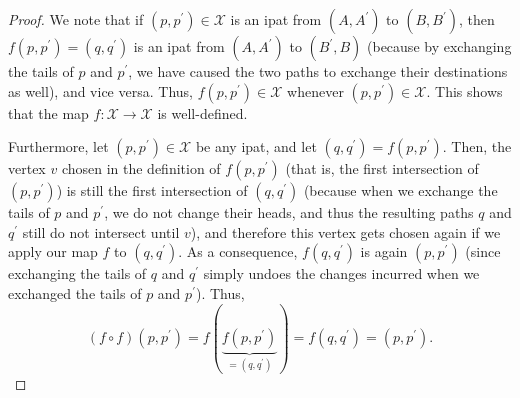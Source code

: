 \begin{definition}
\begin{proof}
We note that if $\left(  p,p^{\prime}\right)  \in\mathcal{X}$ is an ipat from
$\left(  A,A^{\prime}\right)  $ to $\left(  B,B^{\prime}\right)  $, then
$f\left(  p,p^{\prime}\right)  =\left(  q,q^{\prime}\right)  $ is an ipat from
$\left(  A,A^{\prime}\right)  $ to $\left(  B^{\prime},B\right)  $ (because by
exchanging the tails of $p$ and $p^{\prime}$, we have caused the two paths to
exchange their destinations as well), and vice versa. Thus, $f\left(
p,p^{\prime}\right)  \in\mathcal{X}$ whenever $\left(  p,p^{\prime}\right)
\in\mathcal{X}$. This shows that the map $f:\mathcal{X}\rightarrow\mathcal{X}$
is well-defined.

Furthermore, let $\left(  p,p^{\prime}\right)  \in\mathcal{X}$ be any ipat,
and let $\left(  q,q^{\prime}\right)  =f\left(  p,p^{\prime}\right)  $. Then,
the vertex $v$ chosen in the definition of $f\left(  p,p^{\prime}\right)  $
(that is, the first intersection of $\left(  p,p^{\prime}\right)  $) is still
the first intersection of $\left(  q,q^{\prime}\right)  $ (because when we
exchange the tails of $p$ and $p^{\prime}$, we do not change their heads, and
thus the resulting paths $q$ and $q^{\prime}$ still do not intersect until
$v$), and therefore this vertex gets chosen again if we apply our map $f$ to
$\left(  q,q^{\prime}\right)  $. As a consequence, $f\left(  q,q^{\prime
}\right)  $ is again $\left(  p,p^{\prime}\right)  $ (since exchanging the
tails of $q$ and $q^{\prime}$ simply undoes the changes incurred when we
exchanged the tails of $p$ and $p^{\prime}$). Thus,
\[
\left(  f\circ f\right)  \left(  p,p^{\prime}\right)  =f\left(
\underbrace{f\left(  p,p^{\prime}\right)  }_{=\left(  q,q^{\prime}\right)
}\right)  =f\left(  q,q^{\prime}\right)  =\left(  p,p^{\prime}\right)  .
\]



\end{proof}
\end{definition}
